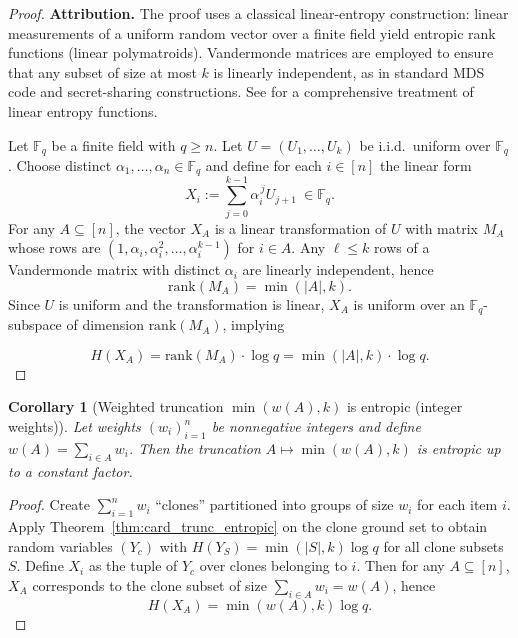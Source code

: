 \documentclass[conference]{IEEEtran}
\newtheorem{corollary}{Corollary}
\theoremstyle{definition}
\theoremstyle{remark}
\begin{document}
\begin{proof}
\noindent\textbf{Attribution.}
The proof uses a classical linear-entropy construction: linear measurements of a uniform random vector over a finite
field yield entropic rank functions (linear polymatroids).
Vandermonde matrices are employed to ensure that any subset of size at most $k$ is linearly independent, as in
standard MDS code and secret-sharing constructions.
See \cite{Yeung2008} for a comprehensive treatment of linear entropy functions.

Let $\mathbb{F}_q$ be a finite field with $q\ge n$. Let $U=(U_1,\dots,U_k)$ be i.i.d.\ uniform over
$\mathbb{F}_q$. Choose distinct $\alpha_1,\dots,\alpha_n\in\mathbb{F}_q$ and define for each $i\in[n]$
the linear form
\[
X_i := \sum_{j=0}^{k-1} \alpha_i^{\,j} U_{j+1}\ \in \mathbb{F}_q.
\]
For any $A\subseteq[n]$, the vector $X_A$ is a linear transformation of $U$ with matrix $M_A$ whose rows are
$(1,\alpha_i,\alpha_i^2,\dots,\alpha_i^{k-1})$ for $i\in A$. Any $\ell\le k$ rows of a Vandermonde matrix with
distinct $\alpha_i$ are linearly independent, hence
\begin{equation}
\text{rank}(M_A)=\min(|A|,k).
\end{equation}
Since $U$ is uniform and the transformation is linear, $X_A$ is uniform over an $\mathbb{F}_q$-subspace of
dimension $\text{rank}(M_A)$, implying

\begin{equation}
H(X_A)=\text{rank}(M_A)\cdot \log q = \min(|A|,k)\cdot \log q.
\end{equation}
\end{proof}

\begin{corollary}[Weighted truncation $\min(w(A),k)$ is entropic (integer weights)]
\label{cor:weighted_trunc_entropic}
Let weights $(w_i)_{i=1}^n$ be nonnegative integers and define $w(A)=\sum_{i\in A} w_i$.
Then the truncation $A\mapsto \min(w(A),k)$ is entropic up to a constant factor.
\end{corollary}

\begin{proof}
Create $\sum_{i=1}^n w_i$ ``clones'' partitioned into groups of size $w_i$ for each item $i$.
Apply Theorem~\ref{thm:card_trunc_entropic} on the clone ground set to obtain random variables $(Y_c)$
with $H(Y_S)=\min(|S|,k)\log q$ for all clone subsets $S$.
Define $X_i$ as the tuple of $Y_c$ over clones belonging to $i$.
Then for any $A\subseteq[n]$, $X_A$ corresponds to the clone subset of size $\sum_{i\in A} w_i=w(A)$, hence
\[
H(X_A)=\min(w(A),k)\log q.
\]
\end{proof}
\end{document}

